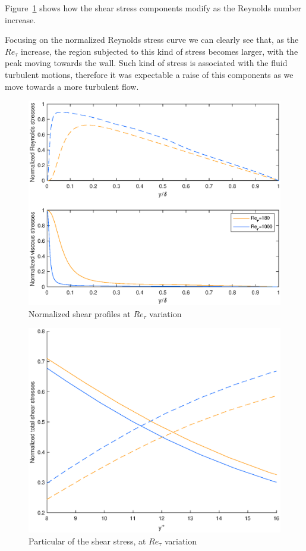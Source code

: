 Figure~\ref{shear:comparison} shows how the shear stress components modify as the Reynolds number increase. \par
Focusing on the normalized Reynolds stress curve we can clearly see that, as the $Re_{\tau}$ increase, the region subjected to this kind of stress becomes larger, with the peak moving towards the wall. Such kind of stress is associated with the fluid turbulent motions, therefore it was expectable a raise of this components as we move towards a more turbulent flow. \par

\begin{figure}
\begin{center}
\includegraphics[scale=0.55]{grafici/shear_comparison.eps}
\caption{Normalized shear profiles at $Re_{\tau}$ variation}
\label{shear:comparison}
\end{center}
\end{figure}

\begin{figure}
\begin{center}
\includegraphics[scale=0.55]{grafici/y12.eps}
\caption{Particular of the shear stress, at $Re_{\tau}$ variation}
\label{y12}
\end{center}
\end{figure}

